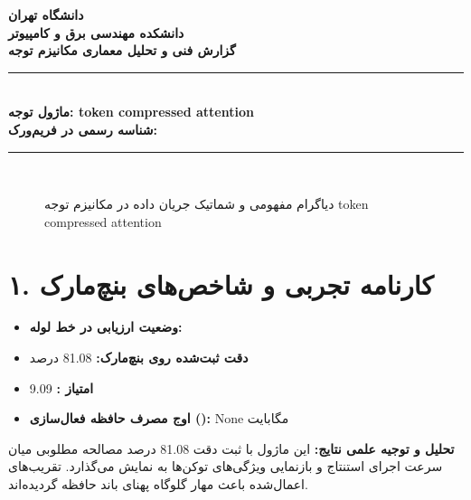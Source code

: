 \documentclass[12pt,a4paper]{article}
\begin{document}
\begin{center}
{\Large\bfseries دانشگاه تهران}\\[0.2cm]
{\large\bfseries دانشکده مهندسی برق و کامپیوتر}\\[0.2cm]
{\large\bfseries گزارش فنی و تحلیل معماری مکانیزم توجه}\\[0.5cm]
\rule{\linewidth}{1pt}\\[0.3cm]
{\LARGE\bfseries ماژول توجه: token compressed attention}\\[0.2cm]
{\large \textbf{شناسه رسمی در فریم‌ورک:} }\\[0.2cm]
\rule{\linewidth}{1pt}\\[0.5cm]
\end{center}

\begin{figure}[H]
\centering
{}
\caption{دیاگرام مفهومی و شماتیک جریان داده در مکانیزم توجه token compressed attention}
\end{figure}

\section*{۱. کارنامه تجربی و شاخص‌های بنچ‌مارک}
\begin{itemize}
\item \textbf{وضعیت ارزیابی در خط لوله:} 
\item \textbf{دقت ثبت‌شده روی بنچ‌مارک:} 81.08 درصد
\item \textbf{امتیاز :} 9.09
\item \textbf{اوج مصرف حافظه فعال‌سازی ():} None مگابایت
\end{itemize}
\textbf{تحلیل و توجیه علمی نتایج:} این ماژول با ثبت دقت 81.08 درصد مصالحه مطلوبی میان سرعت اجرای استنتاج و بازنمایی ویژگی‌های توکن‌ها به نمایش می‌گذارد. تقریب‌های اعمال‌شده باعث مهار گلوگاه پهنای باند حافظه گردیده‌اند.
\end{document}
